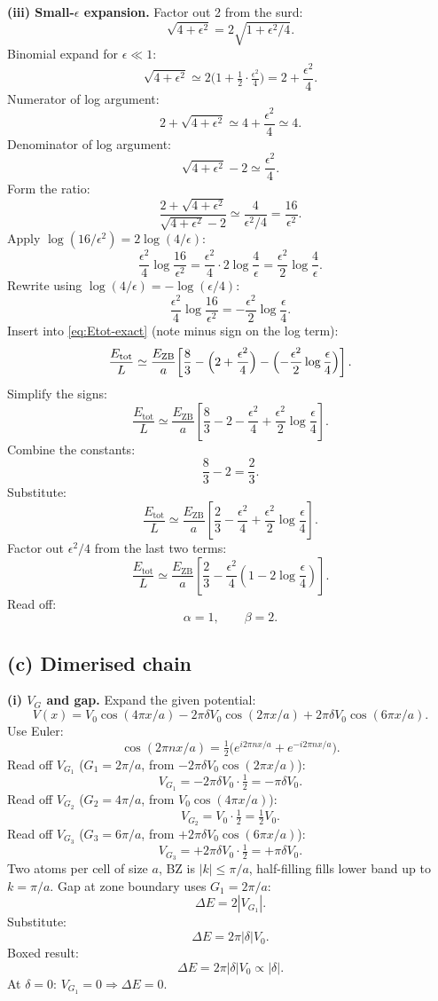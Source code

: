 \documentclass[11pt]{article}
\begin{document}
\textbf{(iii) Small-$\epsilon$ expansion.} Factor out 2 from the surd:
\[ \sqrt{4+\epsilon^2}=2\sqrt{1+\epsilon^2/4}. \]
Binomial expand for $\epsilon\ll 1$:
\[ \sqrt{4+\epsilon^2}\simeq 2\bigl(1+\tfrac{1}{2}\cdot\tfrac{\epsilon^2}{4}\bigr)=2+\frac{\epsilon^2}{4}. \]
Numerator of log argument:
\[ 2+\sqrt{4+\epsilon^2}\simeq 4+\frac{\epsilon^2}{4}\simeq 4. \]
Denominator of log argument:
\[ \sqrt{4+\epsilon^2}-2\simeq\frac{\epsilon^2}{4}. \]
Form the ratio:
\[ \frac{2+\sqrt{4+\epsilon^2}}{\sqrt{4+\epsilon^2}-2}\simeq\frac{4}{\epsilon^2/4}=\frac{16}{\epsilon^2}. \]
Apply $\log(16/\epsilon^2)=2\log(4/\epsilon)$:
\[ \frac{\epsilon^2}{4}\log\!\frac{16}{\epsilon^2}=\frac{\epsilon^2}{4}\cdot 2\log\!\frac{4}{\epsilon}=\frac{\epsilon^2}{2}\log\!\frac{4}{\epsilon}. \]
Rewrite using $\log(4/\epsilon)=-\log(\epsilon/4)$:
\[ \frac{\epsilon^2}{4}\log\!\frac{16}{\epsilon^2}=-\frac{\epsilon^2}{2}\log\!\frac{\epsilon}{4}. \]
Insert into \eqref{eq:Etot-exact} (note minus sign on the log term):
\[ \frac{E_{\text{tot}}}{L}\simeq\frac{E_{\text{ZB}}}{a}\!\left[\frac{8}{3}-\Bigl(2+\frac{\epsilon^2}{4}\Bigr)-\Bigl(-\frac{\epsilon^2}{2}\log\frac{\epsilon}{4}\Bigr)\right]. \]
Simplify the signs:
\[ \frac{E_{\text{tot}}}{L}\simeq\frac{E_{\text{ZB}}}{a}\!\left[\frac{8}{3}-2-\frac{\epsilon^2}{4}+\frac{\epsilon^2}{2}\log\!\frac{\epsilon}{4}\right]. \]
Combine the constants:
\[ \frac{8}{3}-2=\frac{2}{3}. \]
Substitute:
\[ \frac{E_{\text{tot}}}{L}\simeq\frac{E_{\text{ZB}}}{a}\!\left[\frac{2}{3}-\frac{\epsilon^2}{4}+\frac{\epsilon^2}{2}\log\!\frac{\epsilon}{4}\right]. \]
Factor out $\epsilon^2/4$ from the last two terms:
\[ \frac{E_{\text{tot}}}{L}\simeq\frac{E_{\text{ZB}}}{a}\!\left[\frac{2}{3}-\frac{\epsilon^2}{4}\!\left(1-2\log\!\frac{\epsilon}{4}\right)\right]. \]
Read off:
\begin{equation}
\boxed{\;\alpha=1,\qquad \beta=2.\;}
\label{eq:Etot-expand}
\end{equation}

\subsection*{(c) Dimerised chain}

\textbf{(i) $V_G$ and gap.} Expand the given potential:
\[ V(x)=V_0\cos(4\pi x/a)-2\pi\delta V_0\cos(2\pi x/a)+2\pi\delta V_0\cos(6\pi x/a). \]
Use Euler:
\[ \cos(2\pi n x/a)=\tfrac12\bigl(e^{i 2\pi n x/a}+e^{-i 2\pi n x/a}\bigr). \]
Read off $V_{G_1}$ ($G_1=2\pi/a$, from $-2\pi\delta V_0\cos(2\pi x/a)$):
\[ V_{G_1}=-2\pi\delta V_0\cdot\tfrac12=-\pi\delta V_0. \]
Read off $V_{G_2}$ ($G_2=4\pi/a$, from $V_0\cos(4\pi x/a)$):
\[ V_{G_2}=V_0\cdot\tfrac12=\tfrac12 V_0. \]
Read off $V_{G_3}$ ($G_3=6\pi/a$, from $+2\pi\delta V_0\cos(6\pi x/a)$):
\[ V_{G_3}=+2\pi\delta V_0\cdot\tfrac12=+\pi\delta V_0. \]
Two atoms per cell of size $a$, BZ is $|k|\le\pi/a$, half-filling fills lower band up to $k=\pi/a$. Gap at zone boundary uses $G_1=2\pi/a$:
\[ \Delta E=2|V_{G_1}|. \]
Substitute:
\[ \Delta E=2\pi|\delta|V_0. \]
Boxed result:
\begin{equation}
\boxed{\;\Delta E=2\pi|\delta|V_0\propto|\delta|.\;}
\label{eq:gap-dimer}
\end{equation}
At $\delta=0$: $V_{G_1}=0\Rightarrow\Delta E=0$.
\end{document}

